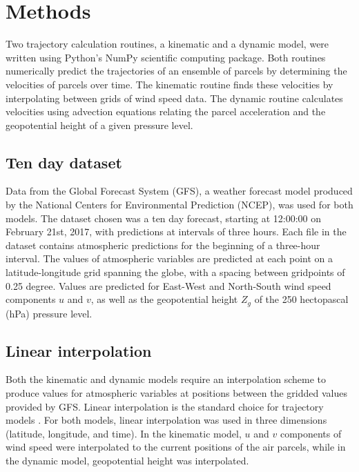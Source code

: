 \chapter{Methods}

Two trajectory calculation routines, a kinematic and a dynamic model, were written using Python's NumPy scientific computing package.
Both routines numerically predict the trajectories of an ensemble of parcels by determining the velocities of parcels over time. 
The kinematic routine finds these velocities by interpolating between grids of wind speed data. 
The dynamic routine calculates velocities using advection equations relating the parcel acceleration and the geopotential height of a given pressure level. 

\section{Ten day dataset}
Data from the Global Forecast System (GFS), a weather forecast model produced by the National Centers for Environmental Prediction (NCEP), was used for both models.
The dataset chosen was a ten day forecast, starting at 12:00:00 on February 21st, 2017, with predictions at intervals of three hours.
Each file in the dataset contains atmospheric predictions for the beginning of a three-hour interval. 
The values of atmospheric variables are predicted at each point on a latitude-longitude grid spanning the globe, with a spacing between gridpoints of 0.25 degree.
Values are predicted for East-West and North-South wind speed components $u$ and $v$, as well as the geopotential height $Z_g$ of the 250 hectopascal (hPa) pressure level.

\section{Linear interpolation}
Both the kinematic and dynamic models require an interpolation scheme to produce values for atmospheric variables at positions between the gridded values provided by GFS. 
Linear interpolation is the standard choice for trajectory models \cite{bowman_input_2013}. 
For both models, linear interpolation was used in three dimensions (latitude, longitude, and time). 
In the kinematic model, $u$ and $v$ components of wind speed were interpolated to the current positions of the air parcels, while in the dynamic model, geopotential height was interpolated.

